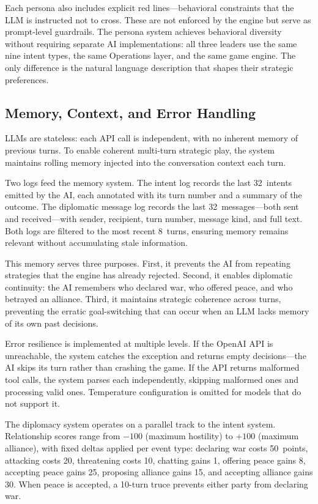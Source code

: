 \documentclass[conference]{IEEEtran}
\begin{document}
Each persona also includes explicit red lines---behavioral constraints that
the LLM is instructed not to cross. These are not enforced by the engine
but serve as prompt-level guardrails. The persona system achieves behavioral
diversity without requiring separate AI implementations: all three leaders
use the same nine intent types, the same Operations layer, and the same
game engine. The only difference is the natural language description that
shapes their strategic preferences.

\subsection{Memory, Context, and Error Handling}

LLMs are stateless: each API call is independent, with no inherent memory
of previous turns. To enable coherent multi-turn strategic play, the
system maintains rolling memory injected into the conversation context each
turn.

Two logs feed the memory system. The intent log records the last 32~intents
emitted by the AI, each annotated with its turn number and a summary of the
outcome. The diplomatic message log records the last 32~messages---both
sent and received---with sender, recipient, turn number, message kind, and
full text. Both logs are filtered to the most recent 8~turns, ensuring
memory remains relevant without accumulating stale information.

This memory serves three purposes. First, it prevents the AI from repeating
strategies that the engine has already rejected. Second, it enables
diplomatic continuity: the AI remembers who declared war, who offered
peace, and who betrayed an alliance. Third, it maintains strategic
coherence across turns, preventing the erratic goal-switching that can
occur when an LLM lacks memory of its own past decisions.

Error resilience is implemented at multiple levels. If the OpenAI API is
unreachable, the system catches the exception and returns empty
decisions---the AI skips its turn rather than crashing the game. If the API
returns malformed tool calls, the system parses each independently,
skipping malformed ones and processing valid ones. Temperature
configuration is omitted for models that do not support it.

The diplomacy system operates on a parallel track to the intent system.
Relationship scores range from $-100$ (maximum hostility) to $+100$ (maximum
alliance), with fixed deltas applied per event type: declaring war costs
50~points, attacking costs 20, threatening costs 10, chatting gains 1,
offering peace gains 8, accepting peace gains 25, proposing alliance
gains 15, and accepting alliance gains 30. When peace is accepted, a
10-turn truce prevents either party from declaring war.
\end{document}
